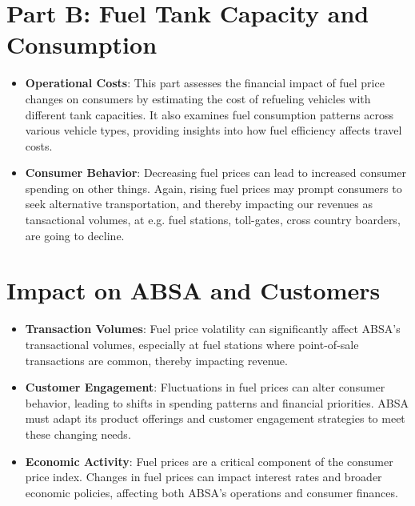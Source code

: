 \documentclass{article}
\begin{document}
	\section*{Part B: Fuel Tank Capacity and Consumption}
	\begin{itemize}
		\item \textbf{Operational Costs}: This part assesses the financial impact of fuel price changes on consumers by estimating the cost of refueling vehicles with different tank capacities. It also examines fuel consumption patterns across various vehicle types, providing insights into how fuel efficiency affects travel costs.
		\item \textbf{Consumer Behavior}: Decreasing fuel prices can lead to increased consumer spending on other things. Again, rising fuel prices may prompt consumers to seek alternative transportation, and thereby impacting our revenues as tansactional volumes, at
		e.g. fuel stations, toll-gates, cross country boarders, are going to decline.
	\end{itemize}
	
	\section*{Impact on ABSA and Customers}
	\begin{itemize}
		\item \textbf{Transaction Volumes}: Fuel price volatility can significantly affect ABSA's transactional volumes, especially at fuel stations where point-of-sale transactions are common, thereby impacting revenue.
		\item \textbf{Customer Engagement}: Fluctuations in fuel prices can alter consumer behavior, leading to shifts in spending patterns and financial priorities. ABSA must adapt its product offerings and customer engagement strategies to meet these changing needs.
		\item \textbf{Economic Activity}: Fuel prices are a critical component of the consumer price index. Changes in fuel prices can impact interest rates and broader economic policies, affecting both ABSA's operations and consumer finances.
	\end{itemize}
	
\end{document}
